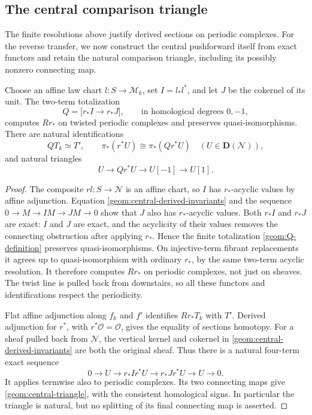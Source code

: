 \subsection{The central comparison triangle}

The finite resolutions above justify derived sections on periodic
complexes.  For the reverse transfer, we now construct the central
pushforward itself from exact functors and retain the natural comparison
triangle, including its possibly nonzero connecting map.

\begin{proposition}\label{geom:relative-pushforward}
Choose an affine law chart $l:S\to\mathcal M_k$, set
$I=l_*l^*$, and let $J$ be the cokernel of its unit.  The two-term
totalization
\begin{equation}\label{geom:Q-definition}
 Q=\bigl[r_*I\longrightarrow r_*J\bigr],
 \qquad\text{in homological degrees }0,-1,
\end{equation}
computes $Rr_*$ on twisted periodic complexes and preserves
quasi-isomorphisms.  There are natural identifications
\[
 QT_k\simeq T',\qquad
 \pi_*(r^*U)\cong\pi_*(Qr^*U)\quad(U\in\mathbf D(\mathcal N)),
\]
and natural triangles
\begin{equation}\label{geom:central-triangle}
 U\longrightarrow Qr^*U\longrightarrow U[-1]
                     \longrightarrow U[1].
\end{equation}
\end{proposition}

\begin{proof}
The composite $rl:S\to\mathcal N$ is an affine chart, so $I$ has
$r_*$-acyclic values by affine adjunction.  Equation
\eqref{geom:central-derived-invariants} and the sequence
$0\to M\to IM\to JM\to0$ show that $J$ also has $r_*$-acyclic
values.  Both $r_*I$ and $r_*J$ are exact: $I$ and $J$ are exact,
and the acyclicity of their values removes the connecting
obstruction after applying $r_*$.  Hence the finite totalization
\eqref{geom:Q-definition} preserves quasi-isomorphisms.  On
injective-term fibrant replacements it agrees up to quasi-isomorphism
with ordinary $r_*$, by the same two-term acyclic resolution.
It therefore computes $Rr_*$ on periodic complexes, not just on
sheaves.  The twist line is pulled back from downstairs, so all
these functors and identifications respect the periodicity.

Flat affine adjunction along $f_k$ and $f'$ identifies
$Rr_*T_k$ with $T'$.  Derived adjunction for $r^*$, with
$r^*\mathcal O=\mathcal O$, gives the equality of sections homotopy.
For a sheaf pulled back from $\mathcal N$, the vertical kernel and
cokernel in \eqref{geom:central-derived-invariants} are both the
original sheaf.  Thus there is a natural four-term exact sequence
\[
 0\longrightarrow U\longrightarrow r_*Ir^*U
 \longrightarrow r_*Jr^*U\longrightarrow U\longrightarrow0.
\]
It applies termwise also to periodic complexes.  Its two connecting
maps give \eqref{geom:central-triangle}, with the consistent
homological signs.  In particular the triangle is natural, but
no splitting of its final connecting map is asserted.
\end{proof}

